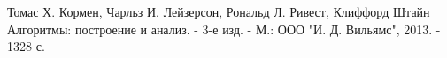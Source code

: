 \begin{thebibliography}{99}
    Томас Х. Кормен, Чарльз И. Лейзерсон, Рональд Л. Ривест, 
    Клиффорд Штайн Алгоритмы: построение и анализ. - 3-е изд. - М.: ООО "И. Д. Вильямс", 2013. - 1328 с.
\end{thebibliography}
\pagebreak
